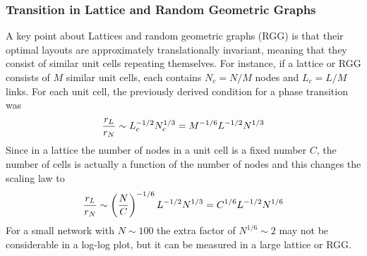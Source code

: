 \documentclass[11pt]{article}
\begin{document}
\subsubsection{Transition in Lattice and Random Geometric Graphs}
A key point about Lattices and random geometric graphs (RGG) is that their optimal layouts are approximately translationally invariant, meaning that they consist of similar unit cells repeating themselves. 
For instance, if a lattice or RGG consists of $M$ similar unit cells, each contains $N_c = N/M$ nodes and $L_c=L/M$ links. 
For each unit cell, the previously derived condition for a phase transition was 
\[{r_L\over r_N} \sim L_c^{-1/2} N_c^{1/3} = M^{-1/6} L^{-1/2} N^{1/3} \]
Since in a lattice the number of nodes in a unit cell is a fixed number $C$, the number of cells is actually a function of the number of nodes and this changes the scaling law to 
\[{r_L\over r_N} \sim \left({N\over C}\right)^{-1/6} L^{-1/2} N^{1/3} = C^{1/6} L^{-1/2} N^{1/6} \]
For a small network with $N\sim 100$ the extra factor of $N^{1/6}\sim 2$ may not be considerable in a log-log plot, but it can be measured in a large lattice or RGG. 
\end{document}
